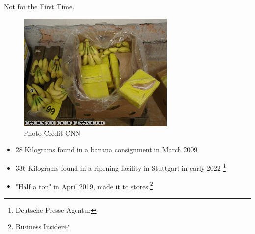 \documentclass{beamer}
\begin{document}
\begin{frame}{Not for the First Time.}
    \begin{figure}
\includegraphics[scale=0.45]{art.bananas.drugs.cnn.jpg}
\caption{Photo Credit CNN}
\end{figure}
\begin{itemize}
    \item 28 Kilograms found in a banana consignment in March 2009
    \item 336 Kilograms found in a ripening facility in Stuttgart in early 2022 \footnote[2]{Deutsche Presse-Agentur}
    \item "Half a ton" in April 2019, made it to stores.\footnote[3]{Business Insider}
\end{itemize}
\end{frame}
    
\end{document}
